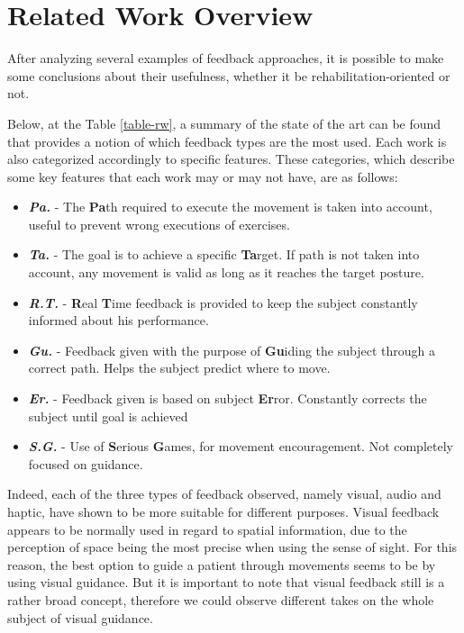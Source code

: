 \section{Related Work Overview}



After analyzing several examples of feedback approaches, it is possible to make some conclusions about their usefulness, whether it be rehabilitation-oriented or not.

Below, at the Table \ref{table-rw}, a summary of the state of 
the art can be found that provides a notion of which feedback types are the most used. 
Each work is also categorized accordingly to specific features. These categories, which describe some key features that each work may or may not have, are as follows:
\begin{itemize}
\item \emph{\textbf{Pa.}} - The \textbf{Pa}th required to execute the movement is taken into account, useful to prevent wrong executions of exercises.
\item \emph{\textbf{Ta.}} - The goal is to achieve a specific \textbf{Ta}rget. If path is not taken into account, any movement is valid as long as it reaches the target posture.
\item \emph{\textbf{R.T.}} - \textbf{R}eal \textbf{T}ime feedback is provided to keep the subject constantly informed about his performance.
\item \emph{\textbf{Gu.}} - Feedback given with the purpose of \textbf{Gu}iding the subject through a correct path. Helps the subject predict where to move. 
\item \emph{\textbf{Er.}} - Feedback given is based on subject \textbf{Er}ror. Constantly corrects the subject until goal is achieved
\item \emph{\textbf{S.G.}} - Use of \textbf{S}erious \textbf{G}ames, for movement encouragement. Not completely focused on guidance.
\end{itemize}

Indeed, each of the three types of feedback observed, namely visual, audio and haptic, have shown to be more suitable for different purposes.
Visual feedback appears to be normally used in regard to spatial information, due to the perception of space being the most precise when using the sense of sight. For this reason,
the best option to guide a patient through movements seems to be by using visual guidance.
But it is important to note that visual feedback still is a rather broad concept, therefore we could observe different takes on the whole subject of visual guidance.

